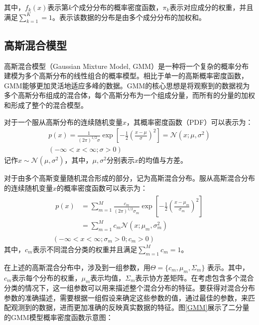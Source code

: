 其中，$f_k(x)$表示第$k$个成分分布的概率密度函数，$\pi_k$表示对应成分的权重，并且满足$\sum_{k=1}^{K}=1$。表示该数据的分布是由多个成分分布的加权和。

\subsection{高斯混合模型}
高斯混合模型（Gaussian Mixture Model, GMM）是一种将一个复杂的概率分布建模为多个高斯分布的线性组合的概率模型。相比于单一的高斯概率密度函数，GMM能够更加灵活地适应多峰的数据。GMM的核心思想是将观察到的数据视为多个高斯分布组成的混合体，每个高斯分布为一个组成分量，而所有的分量的加权和形成了整个的混合模型。

对于一个服从高斯分布的连续随机变量$x$，其概率密度函数（PDF）可以表示为：
\begin{equation}
    \begin{gathered}
        p\left( x \right) =\frac{1}{\left( 2\pi \right) ^{1/2}\sigma}\exp \left[ -\frac{1}{2}\left( \frac{x-\mu}{\sigma} \right) ^2 \right] =\mathcal{N} \left( x;\mu ,\sigma ^2 \right)
        \\
        \left( -\infty <x<\infty ;\sigma >0 \right)
    \end{gathered}
\end{equation}
记作$x \sim \mathcal{N}(\mu,\sigma^2)$，其中，$\mu,\sigma^2$分别表示$x$的均值与方差。

对于由多个高斯变量随机混合形成的部分，记为高斯混合分布。服从高斯混合分布的连续随机变量$x$的概率密度函数可以表示为：
\begin{equation}
    \begin{gathered}
        \begin{aligned}
            p(x) & =\sum_{m=1}^M \frac{c_m}{(2 \pi)^{1 / 2} \sigma_m} \exp \left[-\frac{1}{2}\left(\frac{x-\mu_m}{\sigma_m}\right)^2\right] \\ & =\sum_{m=1}^M c_m \mathcal{N}\left(x ; \mu_m, \sigma_m^2\right)
        \end{aligned}
        \\
        \left(-\infty<x<\infty ; \sigma_m>0 ; c_m>0\right)
    \end{gathered}
\end{equation}
其中，$c_m$表示不同混合分类的权重并且满足$\sum_{m=1}^M c_m=1$。

在上述的高斯混合分布中，涉及到一组参数，用$\Theta = \{c_m, \mu_m, \Sigma_m\}$ 表示。其中，$c_m$表示每个分布的权重，$\mu_m$表示均值，$\Sigma_m$表示协方差矩阵。在考虑包含多个混合分类的情况下，这一组参数可以用来描述整个混合分布的特征。要获得对混合分布参数的准确描述，需要根据一组假设来确定这些参数的值，通过最佳的参数，来匹配观测到的数据，进而更加准确的反映真实数据的特征。图\ref{GMM}展示了二分量的GMM模型概率密度函数示意图：

